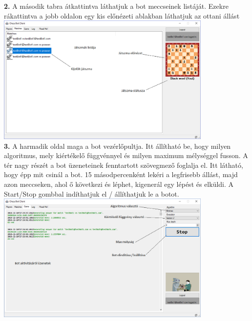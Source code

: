 \documentclass[twoside, a4paper, 12pt]{article}
\begin{document}
\noindent \textbf{2.} A második tabra átkattintva láthatjuk a bot meccseinek listáját. Ezekre rákattintva a jobb oldalon egy kis előnézeti ablakban láthatjuk az ottani állást \\
\includegraphics[width=0.8\textwidth]{img/botClient_2.png} \\

\noindent \textbf{3.} A harmadik oldal maga a bot vezérlőpultja. Itt állítható be, hogy milyen algoritmus, mely kiértékelő függvénnyel és milyen maximum mélységgel fusson. A tér nagy részét a bot üzeneteinek fenntartott szövegmező foglalja el. Itt látható, hogy épp mit csinál a bot. 15 másodpercenként lekéri a legfrisebb állást, majd azon meccseken, ahol ő következi és léphet, kigenerál egy lépést és elküldi. A Start/Stop gombbal indíthatjuk el / állíthatjuk le a botot. \\
\includegraphics[width=0.8\textwidth]{img/botClient_3.png} \\
\end{document}

